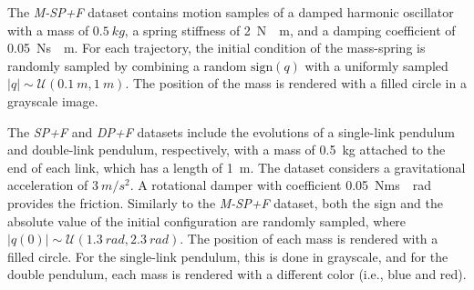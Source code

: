 The \emph{M-SP+F} dataset contains motion samples of a damped harmonic oscillator with a mass of $\SI{0.5}{kg}$, a spring stiffness of \SI{2}{N \per m}, and a damping coefficient of \SI{0.05}{Ns \per m}. For each trajectory, the initial condition of the mass-spring is randomly sampled by combining a random $\mathrm{sign}(q)$ with a uniformly sampled $|q| \sim \mathcal{U}(\SI{0.1}{m}, \SI{1}{m})$. The position of the mass is rendered with a filled circle in a grayscale image.

The \emph{SP+F} and \emph{DP+F} datasets include the evolutions of a single-link pendulum and double-link pendulum, respectively, with a mass of \SI{0.5}{kg} attached to the end of each link, which has a length of \SI{1}{m}. The dataset considers a gravitational acceleration of $\SI{3}{m \per s^2}$. A rotational damper with coefficient \SI{0.05}{Nms \per rad} provides the friction. 
Similarly to the \emph{M-SP+F} dataset, both the sign and the absolute value of the initial configuration are randomly sampled, where $|q(0)| \sim \mathcal{U}(\SI{1.3}{rad}, \SI{2.3}{rad})$.
The position of each mass is rendered with a filled circle. For the single-link pendulum, this is done in grayscale, and for the double pendulum, each mass is rendered with a different color (i.e., blue and red).


